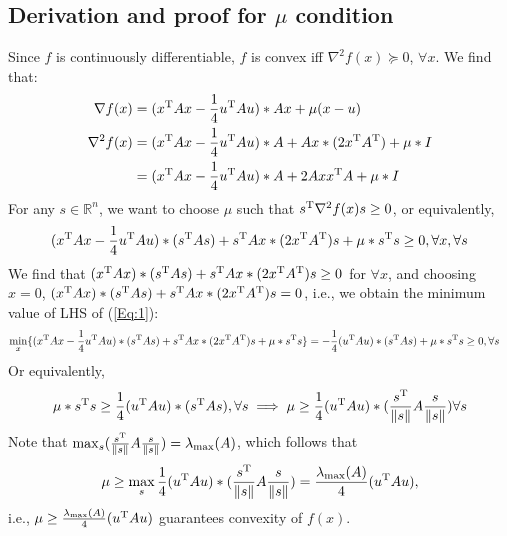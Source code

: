 \clearpage
\subsection{Derivation and proof for $\mu$ condition}
Since $f$ is continuously differentiable, $f$ is convex iff $\nabla^2f(x)\succeq0$, $\forall x$. We find that:
\begin{align*}
\nabla f(x)&=(x^{\mathrm T} Ax - \frac{1}{4}u^{\mathrm T} Au)*Ax + \mu (x-u)\\
\nabla^2f(x)&=(x^{\mathrm T} Ax - \frac{1}{4}u^{\mathrm T} Au)*A
+Ax*(2x^{\mathrm T} A^{\mathrm T})+\mu*I\\
&=(x^{\mathrm T} Ax - \frac{1}{4}u^{\mathrm T} Au)*A+2Axx^{\mathrm T} A+\mu*I
\end{align*}
For any $s\in\mathbb{R}^n$, we want to choose $\mu$ such that $s^{\mathrm T} \nabla^2f(x)s\ge0$, or equivalently,
\begin{equation}\label{Eq:1}
(x^{\mathrm T} Ax - \frac{1}{4}u^{\mathrm T} Au)*(s^{\mathrm T} As)
+s^{\mathrm T} Ax*(2x^{\mathrm T} A^{\mathrm T})s+\mu*s^{\mathrm T} s\ge0,\forall x,\forall s
\end{equation}
We find that $(x^{\mathrm T} Ax)*(s^{\mathrm T} As)+s^{\mathrm T} Ax*(2x^{\mathrm T} A^{\mathrm T})s\ge0$ for $\forall x$, and choosing $x=0$, $(x^{\mathrm T} Ax)*(s^{\mathrm T} As)+s^{\mathrm T} Ax*(2x^{\mathrm T} A^{\mathrm T})s=0$, i.e., we obtain the minimum value of LHS of (\ref{Eq:1}):
\begin{align*}
\min_{x}\{(x^{\mathrm T} Ax - \frac{1}{4}u^{\mathrm T} Au)*(s^{\mathrm T} As)
+s^{\mathrm T} Ax*(2x^{\mathrm T} A^{\mathrm T})s+\mu*s^{\mathrm T} s\}&=-\frac{1}{4}(u^{\mathrm T} Au)*(s^{\mathrm T} As)+\mu*s^{\mathrm T} s\ge0,\forall s
\end{align*}
Or equivalently,
\[
\mu*s^{\mathrm T} s\ge \frac{1}{4}(u^{\mathrm T} Au)*(s^{\mathrm T} As),\forall s\implies
\mu\ge\frac{1}{4}(u^{\mathrm T} Au)*(\frac{s^{\mathrm T}}{\|s\|}A\frac{s}{\|s\|})\forall s
\]
Note that $\max_{s}(\frac{s^{\mathrm T}}{\|s\|}A\frac{s}{\|s\|})=\lambda_{\max}(A)$, which follows that
\[
\mu\ge\max_{s}\frac{1}{4}(u^{\mathrm T} Au)*(\frac{s^{\mathrm T}}{\|s\|}A\frac{s}{\|s\|})=\frac{\lambda_{\max}(A)}{4}(u^{\mathrm T} Au),
\]
i.e., $\mu\ge \frac{\lambda_{\max}(A)}{4}(u^{\mathrm T} Au)$ guarantees convexity of $f(x)$.








